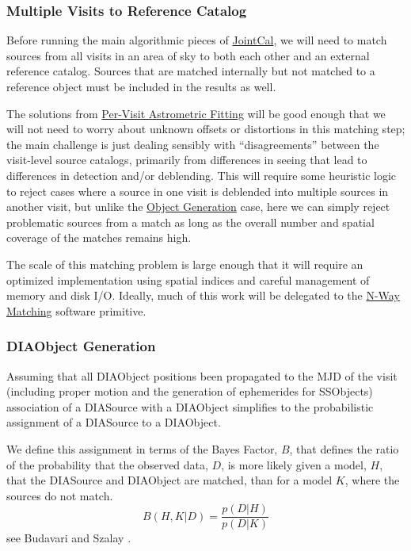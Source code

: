 


\subsubsection{Multiple Visits to Reference Catalog}
\label{sec:acJointCalMatching}

Before running the main algorithmic pieces of \hyperref[sec:drpStandardJointCal]{JointCal}, we will need to match sources from all visits in an area of sky to both each other and an external reference catalog.  Sources that are matched internally but not matched to a reference object must be included in the results as well.

The solutions from \hyperref[sec:acSingleVisitAstrometricFit]{Per-Visit Astrometric Fitting} will be good enough that we will not need to worry about unknown offsets or distortions in this matching step; the main challenge is just dealing sensibly with ``disagreements'' between the visit-level source catalogs, primarily from differences in seeing that lead to differences in detection and/or deblending.  This will require some heuristic logic to reject cases where a source in one visit is deblended into multiple sources in another visit, but unlike the \hyperref[sec:acObjectGeneration]{Object Generation} case, here we can simply reject problematic sources from a match as long as the overall number and spatial coverage of the matches remains high.

The scale of this matching problem is large enough that it will require an optimized implementation using spatial indices and careful management of memory and disk I/O.  Ideally, much of this work will be delegated to the \hyperref[spTablesNWayMatching]{N-Way Matching} software primitive.

\subsubsection{DIAObject Generation}
\label{sec:acDIAObjectGeneration}

Assuming that all DIAObject positions been propagated to the MJD of
the visit (including proper motion and the generation of ephemerides
for SSObjects) association of a DIASource with a DIAObject simplifies
to the probabilistic assignment of a DIASource to a DIAObject.

We define this assignment in terms of the Bayes Factor, $B$, that defines
the ratio of the probability that the observed data, $D$, is more
likely given a model, $H$, that the DIASource and DIAObject are
matched, than for a model $K$, where the sources do not match.
\begin{equation}
B(H,K|D) = \frac{p(D|H)}{p(D|K)}
\end{equation}
see Budavari and Szalay \cite{2008ApJ...679..301B}.

